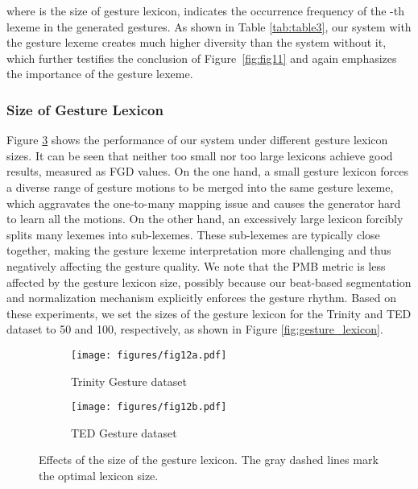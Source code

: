\documentclass[acmtog,authorversion]{acmart}
\newcommand{\fig}{Figure{}~}
\begin{document}
where  is the size of gesture lexicon,  indicates the occurrence frequency of the -th lexeme in the generated gestures. As shown in Table \ref{tab:table3}, our system with the gesture lexeme creates much higher diversity than the system without it, which further testifies the conclusion of \fig\ref{fig:fig11} and again emphasizes the importance of the gesture lexeme.

\subsubsection{Size of Gesture Lexicon}
Figure \ref{fig:fig12} shows the performance of our system under different gesture lexicon sizes. It can be seen that neither too small nor too large lexicons achieve good results, measured as FGD values. On the one hand, a small gesture lexicon forces a diverse range of gesture motions to be merged into the same gesture lexeme, which aggravates the one-to-many mapping issue and causes the generator hard to learn all the motions. On the other hand, an excessively large lexicon forcibly splits many lexemes into sub-lexemes. These sub-lexemes are typically close together, making the gesture lexeme interpretation more challenging and thus negatively affecting the gesture quality. We note that the PMB metric is less affected by the gesture lexicon size, possibly because our beat-based segmentation and normalization mechanism explicitly enforces the gesture rhythm. Based on these experiments, we set the sizes of the gesture lexicon for the Trinity and TED dataset to 50 and 100, respectively, as shown in Figure \ref{fig:gesture_lexicon}.

\begin{figure}[t]
    \centering
    \begin{subfigure}[t]{0.47\linewidth}
        \centering
        \caption*{Trinity Gesture dataset}
        \texttt{[image: figures/fig12a.pdf]}
        \label{fig:fig12a}
    \end{subfigure} 
    \hspace{\fill}
    \begin{subfigure}[t]{0.47\linewidth}
        \centering
        \caption*{TED Gesture dataset}
        \texttt{[image: figures/fig12b.pdf]}
        \label{fig:fig12b}
    \end{subfigure} 
    \caption{Effects of the size of the gesture lexicon. The gray dashed lines mark the optimal lexicon size.}
    \label{fig:fig12}
    \Description{}
\end{figure}
\end{document}

